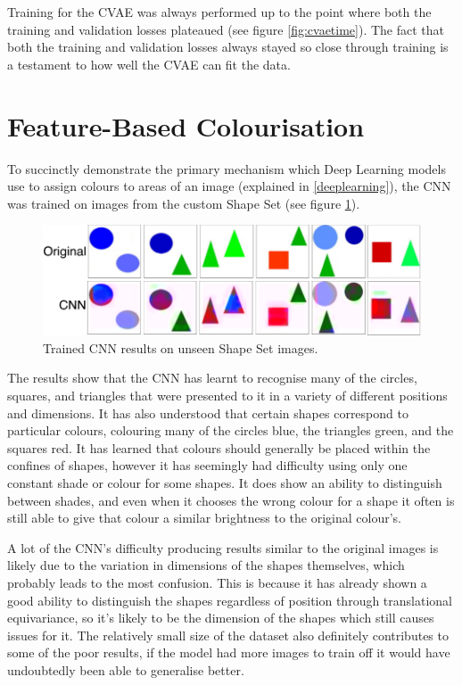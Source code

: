\documentclass{l4proj}
\begin{document}
Training for the CVAE was always performed up to the point where both the training and validation losses plateaued (see figure \ref{fig:cvaetime}). The fact that both the training and validation losses always stayed so close through training is a testament to how well the CVAE can fit the data. 

\section{Feature-Based Colourisation}
\label{shapeseteval}

To succinctly demonstrate the primary mechanism which Deep Learning models use to assign colours to areas of an image (explained in \ref{deeplearning}), the CNN was trained on images from the custom Shape Set (see figure \ref{fig:shapeseteval}). 

\begin{figure}[h]
    \centering
    \includegraphics[width=1.0\linewidth]{images/ShapeSetEval.png}    
    \caption{Trained CNN results on unseen Shape Set images.}

    \label{fig:shapeseteval} 
\end{figure}

The results show that the CNN has learnt to recognise many of the circles, squares, and triangles that were presented to it in a variety of different positions and dimensions. It has also understood that certain shapes correspond to particular colours, colouring many of the circles blue, the triangles green, and the squares red. It has learned that colours should generally be placed within the confines of shapes, however it has seemingly had difficulty using only one constant shade or colour for some shapes. It does show an ability to distinguish between shades, and even when it chooses the wrong colour for a shape it often is still able to give that colour a similar brightness to the original colour's.

A lot of the CNN's difficulty producing results similar to the original images is likely due to the variation in dimensions of the shapes themselves, which probably leads to the most confusion. This is because it has already shown a good ability to distinguish the shapes regardless of position through translational equivariance, so it's likely to be the dimension of the shapes which still causes issues for it. The relatively small size of the dataset also definitely contributes to some of the poor results, if the model had more images to train off it would have undoubtedly been able to generalise better.
\end{document}
